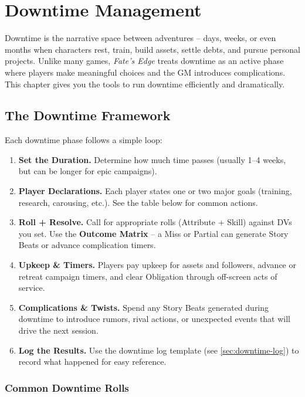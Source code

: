 \chapter{Downtime Management}
\label{ch:downtime}

Downtime is the narrative space between adventures -- days, weeks, or even months when characters rest, train, build assets, settle debts, and pursue personal projects. Unlike many games, \textit{Fate's Edge} treats downtime as an active phase where players make meaningful choices and the GM introduces complications. This chapter gives you the tools to run downtime efficiently and dramatically.

\section{The Downtime Framework}
\label{sec:downtime-framework}

Each downtime phase follows a simple loop:

\begin{enumerate}
\item \textbf{Set the Duration.} Determine how much time passes (usually 1--4 weeks, but can be longer for epic campaigns).
\item \textbf{Player Declarations.} Each player states one or two major goals (training, research, carousing, etc.). See the table below for common actions.
\item \textbf{Roll + Resolve.} Call for appropriate rolls (Attribute + Skill) against DVs you set. Use the \textbf{Outcome Matrix} -- a Miss or Partial can generate Story Beats or advance complication timers.
\item \textbf{Upkeep \& Timers.} Players pay upkeep for assets and followers, advance or retreat campaign timers, and clear Obligation through off-screen acts of service.
\item \textbf{Complications \& Twists.} Spend any Story Beats generated during downtime to introduce rumors, rival actions, or unexpected events that will drive the next session.
\item \textbf{Log the Results.} Use the downtime log template (see \ref{sec:downtime-log}) to record what happened for easy reference.
\end{enumerate}

\subsection{Common Downtime Rolls}
\label{subsec:common-rolls}

